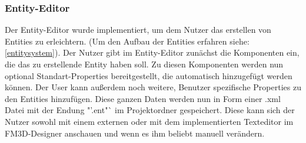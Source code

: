 \subsubsection{Entity-Editor}
\label{entityeditor}
Der Entity-Editor wurde implementiert, um dem Nutzer das erstellen von Entities zu erleichtern. (Um den Aufbau der Entities erfahren siehe: \ref{entitysystem}). Der Nutzer gibt im Entity-Editor zunächst die Komponenten ein, die das zu erstellende Entity haben soll. Zu diesen Komponenten werden nun optional Standart-Properties bereitgestellt, die automatisch hinzugefügt werden können. Der User kann außerdem noch weitere, Benutzer spezifische Properties zu den Entities hinzufügen. Diese ganzen Daten werden nun in Form einer .xml Datei mit der Endung "'.ent"` im Projektordner gespeichert. Diese kann sich der Nutzer sowohl mit einem externen oder mit dem implementierten Texteditor im FM3D-Designer anschauen und wenn es ihm beliebt manuell verändern.


